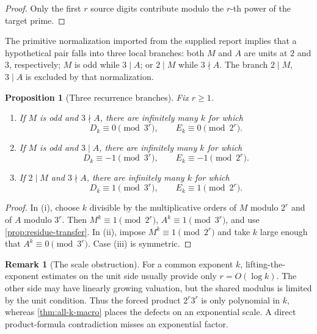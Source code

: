 \documentclass[11pt]{article}
\newtheorem{proposition}[theorem]{Proposition}
\theoremstyle{definition}
\newtheorem{remark}[theorem]{Remark}
\begin{document}
\begin{proof}
Only the first \(r\) source digits contribute modulo the \(r\)-th power of
the target prime.
\end{proof}

The primitive normalization imported from the supplied report implies that
a hypothetical pair falls into three local branches: both \(M\) and \(A\)
are units at \(2\) and \(3\), respectively; \(M\) is odd while \(3\mid A\);
or \(2\mid M\) while \(3\nmid A\).  The branch \(2\mid M\), \(3\mid A\)
is excluded by that normalization.

\begin{proposition}[Three recurrence branches]\label{prop:three-branches}
Fix \(r\ge1\).
\begin{enumerate}[label=(\roman*)]
\item If \(M\) is odd and \(3\nmid A\), there are infinitely many \(k\)
for which
\begin{equation}\label{eq:branch-unit}
 D_k\equiv0\pmod{3^r},
 \qquad E_k\equiv0\pmod{2^r}.
\end{equation}
\item If \(M\) is odd and \(3\mid A\), there are infinitely many \(k\)
for which
\begin{equation}\label{eq:branch-3}
 D_k\equiv-1\pmod{3^r},
 \qquad E_k\equiv-1\pmod{2^r}.
\end{equation}
\item If \(2\mid M\) and \(3\nmid A\), there are infinitely many \(k\)
for which
\begin{equation}\label{eq:branch-2}
 D_k\equiv1\pmod{3^r},
 \qquad E_k\equiv1\pmod{2^r}.
\end{equation}
\end{enumerate}
\end{proposition}

\begin{proof}
In (i), choose \(k\) divisible by the multiplicative orders of \(M\) modulo
\(2^r\) and of \(A\) modulo \(3^r\).  Then
\(M^k\equiv1\pmod{2^r}\), \(A^k\equiv1\pmod{3^r}\), and use
\cref{prop:residue-transfer}.  In (ii), impose
\(M^k\equiv1\pmod{2^r}\) and take \(k\) large enough that
\(A^k\equiv0\pmod{3^r}\).  Case (iii) is symmetric.
\end{proof}

\begin{remark}[The scale obstruction]
For a common exponent \(k\), lifting-the-exponent estimates on the unit side
usually provide only \(r=O(\log k)\).  The other side may have linearly
growing valuation, but the shared modulus is limited by the unit condition.
Thus the forced product \(2^r3^r\) is only polynomial in \(k\), whereas
\cref{thm:all-k-macro} places the defects on an exponential scale.  A direct
product-formula contradiction misses an exponential factor.
\end{remark}
\end{document}
